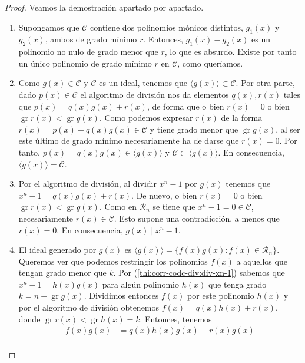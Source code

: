 \begin{proof}
  Veamos la demostración apartado por apartado.
  \begin{enumerate}
    \item Supongamos que \(\mathcal C\) contiene dos polinomios mónicos distintos, \(g_1(x)\) y \(g_2(x)\), ambos de grado mínimo \(r\). 
    Entonces, \(g_1(x) - g_2(x)\) es un polinomio no nulo de grado menor que \(r\), lo que es absurdo. 
    Existe por tanto un único polinomio de grado mínimo \(r\) en \(\mathcal C\), como queríamos.
    \item Como \(g(x) \in \mathcal C\) y \(\mathcal C\) es un ideal, tenemos que \(\langle g(x)\rangle \subset \mathcal C\). 
    Por otra parte, dado \(p(x) \in \mathcal C\) el algoritmo de división nos da elementos \(q(x), r(x)\) tales que \(p(x) = q(x)g(x) + r(x)\), de forma que o bien \(r(x) = 0\) o bien \(\operatorname{gr} r(x) < \operatorname{gr} g(x)\). 
    Como podemos expresar \(r(x)\) de la forma \(r(x) = p(x) - q(x)g(x) \in \mathcal C\) y tiene grado menor que \(\operatorname{gr} g(x)\), al ser este último de grado mínimo necesariamente ha de darse que \(r(x) = 0\).
    Por tanto, \(p(x) = q(x)g(x) \in \langle g(x) \rangle\) y \(\mathcal C \subset \langle g(x) \rangle\).
    En consecuencia, \(\langle g(x) \rangle = \mathcal C\).
    \item Por el algoritmo de división, al dividir \(x^n - 1\) por \(g(x)\) tenemos que \(x^n - 1 = q(x)g(x) + r(x)\). De nuevo, o bien \(r(x) = 0\) o bien \(\operatorname{gr} r(x) < \operatorname{gr} g(x)\).
    Como en \(\mathcal R_n\) se tiene que \(x^n - 1 = 0 \in \mathcal C\), necesariamente \(r(x) \in \mathcal C\).
    Esto supone una contradicción, a menos que \(r(x) = 0\).
    En consecuencia, \(g(x) \mid x^n - 1\).
    \item El ideal generado por \(g(x)\) es \(\langle g(x) \rangle = \{f(x)g(x) : f(x) \in \mathcal R_n\}\).
    Queremos ver que podemos restringir los polinomios \(f(x)\) a aquellos que tengan grado menor que \(k\).
    Por (\ref{thi:corr-codc-div:div-xn-1}) sabemos que \(x^n-1 = h(x)g(x)\) para algún polinomio \(h(x)\) que tenga grado \(k = n - \operatorname{gr} g(x)\).
    Dividimos entonces \(f(x)\) por este polinomio \(h(x)\) y por el algoritmo de división obtenemos \(f(x) = q(x)h(x) + r(x)\), donde \(\operatorname{gr} r(x) < \operatorname{gr} h(x) = k\).
    Entonces, tenemos \begin{align*}
      f(x)g(x) &= q(x)h(x)g(x) + r(x)g(x)\\

\end{align*}
\end{enumerate}
\end{proof}
